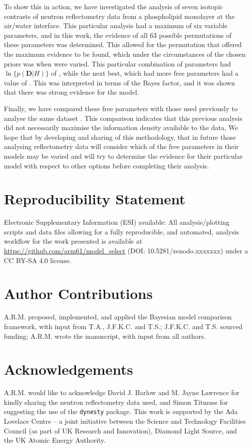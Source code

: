 \documentclass[%
 reprint,
 superscriptaddress,
 amsmath,amssymb,
 aps,
]{revtex4-1}
\begin{document}
To show this in action, we have investigated the analysis of seven isotopic contrasts of neutron reflectometry data from a phospholipid monolayer at the air/water interface. 
This particular analysis had a maximum of six variable parameters, and in this work, the evidence of all \num{63} possible permutations of these parameters was determined. 
This allowed for the permutation that offered the maximum evidence to be found, which under the circumstances of the chosen priors was when  were varied. 
This particular combination of parameters had $\ln\{p(\mathbf{D}|H)\}$ of , while the next best, which had more free parameters had a value of . 
This was interpreted in terms of the Bayes factor, and it was shown that there was strong evidence for the  model.  

Finally, we have compared these free parameters with those used previously to analyse the same dataset \cite{mccluskey_assessing_2019}. 
This comparison indicates that this previous analysis did not necessarily maximise the information density available to the data. 
We hope that by developing and sharing of this methodology, that in future those analysing reflectometry data will consider which of the free parameters in their models may be varied and will try to determine the evidence for their particular model with respect to other options before completing their analysis. 

\section*{Reproducibility Statement}

Electronic Supplementary Information (ESI) available: All analysis/plotting scripts and data files allowing for a fully reproducible, and automated, analysis workflow for the work presented is available at \url{https://github.com/arm61/model\_select} (DOI: 10.5281/zenodo.xxxxxxx) under a CC BY-SA 4.0 license.

\section*{Author Contributions}

A.R.M. proposed, implemented, and applied the Bayesian model comparison framework, with input from T.A., J.F.K.C. and T.S.; J.F.K.C. and T.S. sourced funding; A.R.M. wrote the manuscript, with input from all authors.

\section*{Acknowledgements}

A.R.M. would like to acknowledge David J. Barlow and M. Jayne Lawrence for kindly sharing the neutron reflectometry data used, and Simon Titmuss for suggesting the use of the \texttt{dynesty} package.
This work is supported by the Ada Lovelace Centre – a joint initiative between the Science and Technology Facilities Council (as part of UK Research and Innovation), Diamond Light Source, and the UK Atomic Energy Authority.



\end{document}
